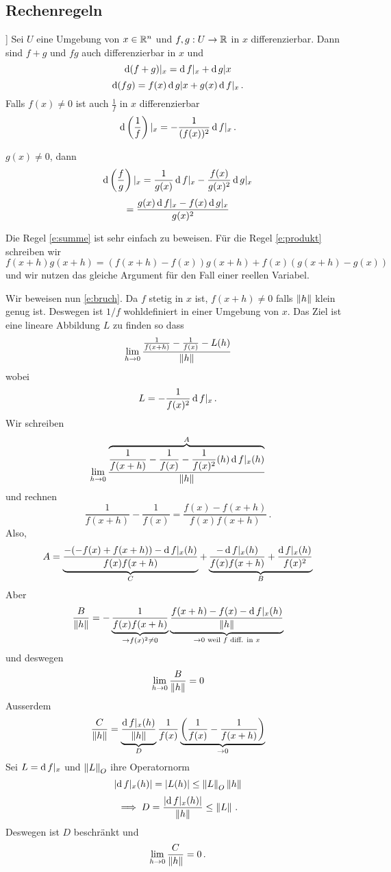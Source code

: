 \subsection{Rechenregeln}
\begin{Sat}\label{s:rechen_diff}]
  Sei $U$ eine Umgebung von $x\in\mathbb{R}^n$ und $f,g:U\rightarrow\mathbb{R}$ in $x$ differenzierbar. Dann sind $f+g$ und $fg$ auch differenzierbar in $x$ und
  \begin{equation}\label{e:summe}
\operatorname{d} (f+g)|_x=\operatorname{d} f|_x+\operatorname{d} g|x
\end{equation}
\begin{equation}\label{e:produkt}
\operatorname{d}(fg)=f(x)\operatorname{d} g|x+g(x)\operatorname{d} f|_x\, .
\end{equation}
  Falls $f(x)\neq 0$ ist auch $\frac{1}{f}$ in $x$ differenzierbar
\begin{equation}\label{e:bruch}
\operatorname{d} \left( \frac{1}{f} \right)|_x=-\frac{1}{(f(x))^2}\operatorname{d} f|_x\, .
\end{equation}
\end{Sat}
\begin{Kor}
  $g(x)\neq 0$, dann
  \[\operatorname{d} \left( \frac{f}{g} \right)|_x=\frac{1}{g(x)}\operatorname{d} f|_x-\frac{f(x)}{g(x)^2}\operatorname{d} g|_x\]
  \[=\frac{g(x)\operatorname{d} f|_x-f(x)\operatorname{d} g|_x}{g(x)^2}\]
\end{Kor}
\begin{Bew} Die Regel \eqref{e:summe} ist sehr einfach zu beweisen.
F\"ur die Regel \eqref{e:produkt} schreiben wir
\[
f(x+h)g(x+h) = (f(x+h)-f(x))g(x+h) + f(x) (g(x+h)-g(x))
\]
und wir nutzen das gleiche Argument f\"ur den Fall einer reellen Variabel.

Wir beweisen nun \eqref{e:bruch}.  Da $f$ stetig in $x$ ist, $f(x+h)\neq 0$ falls $\left\| h \right\|$ klein genug ist.
Deswegen ist $1/f$ wohldefiniert in einer Umgebung von $x$.
Das Ziel ist eine lineare Abbildung $L$ zu finden so dass
  \[\displaystyle\lim_{h\rightarrow0}\frac{\frac{1}{f(x+h)}-\frac{1}{f(x)}-L(h)}{\left\| h \right\|}\]
wobei
\[L=-\frac{1}{f(x)^2}\operatorname{d} f|_x\, .\]
  Wir schreiben
\[\displaystyle\lim_{h\rightarrow0}\frac{\overbrace{\frac{1}{f(x+h)}-\frac{1}{f(x)}-\frac{1}{f(x)^2}(h)\operatorname{d} f|_x(h)}^A}{\left\| h \right\|}\]
und rechnen
  \[\frac{1}{f(x+h)}-\frac{1}{f(x)}=\frac{f(x)-f(x+h)}{f(x)f(x+h)}\, .\]
Also,
 \[A=\underbrace{\frac{-(-f(x)+f(x+h)) - \operatorname{d} f|_x(h)}{f(x)f(x+h)}}_C
+\underbrace{\frac{-\operatorname{d} f|_x(h)}{f(x)f(x+h)} + \frac{\operatorname{d} f|_x(h)}{f(x)^2}}_B\]
Aber
\[\frac{B}{\left\| h \right\|}=-\underbrace{\frac{1}{f(x)f(x+h)}}_{\rightarrow f(x)^2\neq 0}
\underbrace{\frac{f(x+h)-f(x)-\operatorname{d} f|_x(h)}{\left\| h \right\|}}_{\rightarrow 0 \text{ weil $f$ diff. in $x$}}\]
und deswegen
\[\displaystyle\lim_{h\rightarrow0}\frac{B}{\left\| h \right\|}=0\]
Ausserdem
  \[\frac{C}{\left\| h \right\|}=\underbrace{\frac{\operatorname{d} f|_x(h)}{\left\| h \right\|}}_{D}\frac{1}{f(x)}\underbrace{\left( \frac{1}{f(x)}-\frac{1}{f(x+h)} \right)}_{\rightarrow 0}\]
  Sei $L=\operatorname{d} f|_x$ und $\left\| L \right\|_O$ ihre Operatornorm
  \[\left| \operatorname{d} f|_x(h) \right|=\left| L(h) \right|\leq\left\| L \right\|_O\left\| h \right\|\]
  \[\implies D =  \frac{\left| \operatorname{d} f|_x(h) \right|}{\left\| h \right\|}\leq\left\| L \right\|\, .\]
Deswegen ist $D$ beschr\"ankt und 
\[
\lim_{h\rightarrow 0} \frac{C}{\left\| h \right\|} = 0\, .
\]
\end{Bew}
